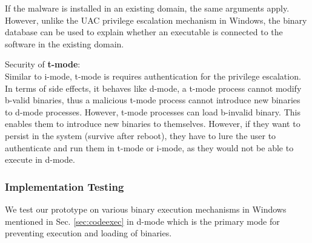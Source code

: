 If the malware is installed in an existing domain,
the same arguments apply. However, unlike the UAC privilege escalation
mechanism in Windows, the binary database can be used to explain 
whether an executable is connected to the software in the existing domain.
% 
\medskip

\noindent
Security of {\bf t-mode}: \\
Similar to i-mode, t-mode is requires authentication for the 
privilege escalation.
In terms of side effects, it behaves like d-mode, a t-mode process 
cannot modify b-valid binaries,
thus a malicious t-mode process cannot introduce new binaries to d-mode
processes.
However, t-mode processes can load b-invalid binary.
This enables them to introduce new binaries to themselves.
However, if they want to persist in the system (survive after reboot),
they have to lure the user to authenticate and run them in t-mode or i-mode,
as they would not be able to execute in d-mode.


\subsubsection{Implementation Testing}

We test our prototype on various binary execution mechanisms in Windows
mentioned in Sec. \ref{sec:codeexec} in d-mode which is the primary mode
for preventing execution and loading of binaries.


